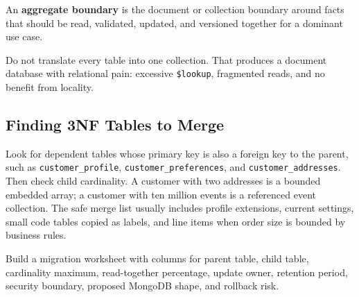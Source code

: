 \begin{definitionbox}
An \textbf{aggregate boundary} is the document or collection boundary around facts that should be read, validated, updated, and versioned together for a dominant use case.
\end{definitionbox}

\begin{notebox}
Do not translate every table into one collection. That produces a document database with relational pain: excessive \texttt{\$lookup}, fragmented reads, and no benefit from locality.
\end{notebox}

\subsection{Finding 3NF Tables to Merge}
Look for dependent tables whose primary key is also a foreign key to the parent, such as \texttt{customer\_profile}, \texttt{customer\_preferences}, and \texttt{customer\_addresses}. Then check child cardinality. A customer with two addresses is a bounded embedded array; a customer with ten million events is a referenced event collection. The safe merge list usually includes profile extensions, current settings, small code tables copied as labels, and line items when order size is bounded by business rules.

\begin{tipbox}
Build a migration worksheet with columns for parent table, child table, cardinality maximum, read-together percentage, update owner, retention period, security boundary, proposed MongoDB shape, and rollback risk.
\end{tipbox}

